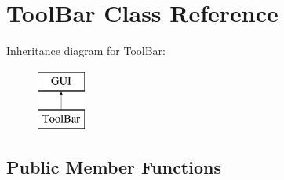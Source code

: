 \hypertarget{class_tool_bar}{}\section{Tool\+Bar Class Reference}
\label{class_tool_bar}
Inheritance diagram for Tool\+Bar\+:\begin{figure}[H]
\begin{center}
\leavevmode
\includegraphics[height=2.000000cm]{class_tool_bar}
\end{center}
\end{figure}
\subsection*{Public Member Functions}

